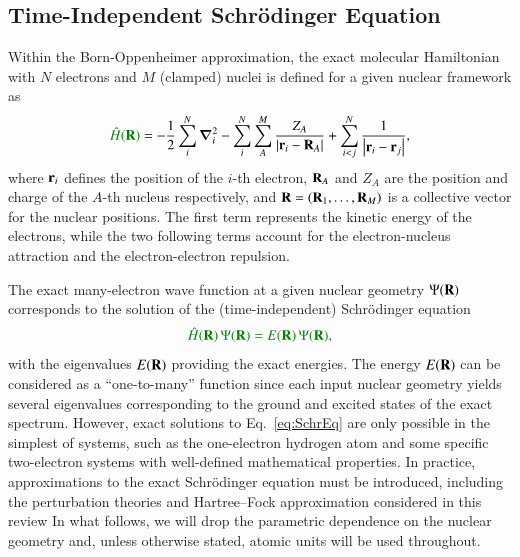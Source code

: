 \documentclass[aps,prb,reprint,noshowkeys,linenumbers,superscriptaddress]{revtex4-1}
\newcommand{\hugh}[1]{\textcolor{hughgreen}{#1}}
\newcommand{\Ne}{N} %
\newcommand{\Nn}{M} %
\newcommand{\hH}{\Hat{H}}
\begin{document}
\subsection{Time-Independent Schr\"odinger Equation}
\label{sec:TDSE}
Within the Born-Oppenheimer approximation, the exact molecular Hamiltonian with $\Ne$ electrons and 
$\Nn$ (clamped) nuclei is defined \hugh{for a given nuclear framework} as
\begin{equation}\label{eq:ExactHamiltonian}
    \hugh{\hH(\vb{R})} = 
    - \frac{1}{2} \sum_{i}^{\Ne} \grad_i^2 
    - \sum_{i}^{\Ne} \sum_{A}^{\Nn} \frac{Z_A}{\abs{\vb{r}_i-\vb{R}_A}} 
    + \sum_{i<j}^{\Ne}\frac{1}{\abs{\vb{r}_i-\vb{r}_j}},
\end{equation}
where $\vb{r}_i$ defines the position of the $i$-th electron, $\vb{R}_{A}$ and $Z_{A}$ are the position
and charge of the $A$-th nucleus respectively, \hugh{and $\vb{R} = (\vb{R}_{1}, \dots, \vb{R}_{\Nn})$ is a
collective vector for the nuclear positions.}
The first term represents the kinetic energy of the electrons, while 
the two following terms account for the electron-nucleus attraction and the electron-electron repulsion.

The exact many-electron wave function \hugh{at a given nuclear geometry} $\Psi(\vb{R})$ corresponds 
to the solution of the (time-independent) Schr\"{o}dinger equation
\begin{equation} 
    \hugh{\hH(\vb{R})\, \Psi(\vb{R}) = E(\vb{R})\, \Psi(\vb{R}),}
    \label{eq:SchrEq}
\end{equation} 
with the eigenvalues $E(\vb{R})$ providing the exact energies.
\hugh{The energy $E(\vb{R})$ can be considered as a ``one-to-many'' function since each input nuclear geometry
yields several eigenvalues corresponding to the ground and excited states of the exact spectrum.}
However, exact solutions to Eq.~\eqref{eq:SchrEq} are only possible in the simplest of systems, such as 
the one-electron hydrogen atom and some specific two-electron systems with well-defined mathematical 
properties.\cite{Taut_1993,Loos_2009b,Loos_2010e,Loos_2012}
\hugh{In practice, approximations to the exact Schr\"{o}dinger equation must be introduced, including
the perturbation theories and Hartree--Fock approximation considered in this review
In what follows, we will drop the parametric dependence on the nuclear geometry and, 
unless otherwise stated, atomic units will be used throughout.}

\end{document}
